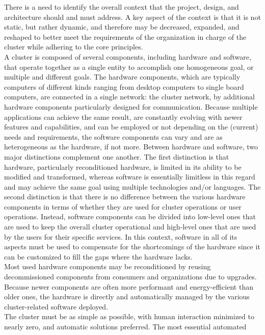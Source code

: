 There is a need to identify the overall context that the project, design, and
architecture should and must address. A key aspect of the context is that it is not
static, but rather dynamic, and therefore may be decreased, expanded, and reshaped
to better meet the requirements of the organization in charge of the cluster while
adhering to the core principles. \\ %
A cluster is composed of several components, including hardware and software, that
operate together as a single entity to accomplish one homogeneous goal, or
multiple and different goals. The hardware components, which are typically
computers of different kinds ranging from desktop computers to single board
computers, are connected in a single network: the cluster network, by additional
hardware components particularly designed for communication. Because multiple
applications can achieve the same result, are constantly evolving with newer features
and capabilities, and can be employed or not depending on the (current) needs
and requirements, the software components can vary and are as heterogeneous as the
hardware, if not more. Between hardware and software, two major distinctions
complement one another. The first distinction is that hardware, particularly
reconditioned hardware, is limited in its ability to be modified and transformed,
whereas software is essentially limitless in this regard and may achieve the
same goal using multiple technologies and/or languages. The second distinction is
that there is no difference between the various hardware components in terms of whether
they are used for cluster operations or user operations. Instead, software components
can be divided into low-level ones that are used to keep the overall cluster operational
and high-level ones that are used by the users for their specific services. In
this context, software in all of its aspects must be used to compensate for the shortcomings
of the hardware since it can be customized to fill the gaps where the hardware lacks.
\\ %
Most used hardware components may be reconditioned by reusing decommissioned components
from consumers and organizations due to upgrades. Because newer components are
often more performant and energy-efficient than older ones, the hardware is directly
and automatically managed by the various cluster-related software deployed. \\ %
The cluster must be as simple as possible, with human interaction minimized to
nearly zero, and automatic solutions preferred. The most essential automated
